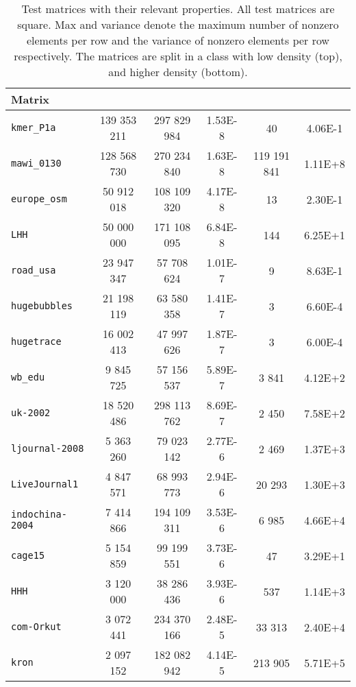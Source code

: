 \begin{table}
    \centering
    \small
    \caption{Test matrices with their relevant properties\protect\footnotemark. All test matrices are square. Max and variance denote the maximum number of nonzero elements per row and the variance of nonzero elements per row respectively. The matrices are split in a class with low density (top), and higher density (bottom).}\label{tab:Matrices}
    \begin{tabular}{l S[table-format=9.0] S[table-format=9.0] S[table-format=1.2e2] S[table-format=9.0] S[table-format=1.2e2]}
        Matrix &  &  &  &  & \\ 
        \midrule
        \texttt{kmer\_P1a}      & 139 353 211 & 297 829 984  & 1.53E-8 & 40          & 4.06E-1\\
        \texttt{mawi\_0130}     & 128 568 730 & 270 234 840  & 1.63E-8 & 119 191 841 & 1.11E+8\\
        \texttt{europe\_osm}    & 50 912 018  & 108 109 320  & 4.17E-8 & 13          & 2.30E-1\\
        \texttt{LHH}            & 50 000 000  & 171 108 095  & 6.84E-8 & 144         & 6.25E+1\\
        \texttt{road\_usa}      & 23 947 347  & 57 708 624   & 1.01E-7 & 9           & 8.63E-1\\
        \texttt{hugebubbles}    & 21 198 119  & 63 580 358   & 1.41E-7 & 3           & 6.60E-4\\
        \texttt{hugetrace}      & 16 002 413  & 47 997 626   & 1.87E-7 & 3           & 6.00E-4\\
        \texttt{wb\_edu}        & 9 845 725   & 57 156 537   & 5.89E-7 & 3 841       & 4.12E+2\\        
        \texttt{uk-2002}        & 18 520 486  & 298 113 762  & 8.69E-7 & 2 450       & 7.58E+2\\
        \midrule
        \texttt{ljournal-2008}  & 5 363 260   & 79 023 142   & 2.77E-6 & 2 469       & 1.37E+3\\
        \texttt{LiveJournal1}   & 4 847 571   & 68 993 773   & 2.94E-6 & 20 293      & 1.30E+3\\
        \texttt{indochina-2004} & 7 414 866   & 194 109 311  & 3.53E-6 & 6 985       & 4.66E+4\\
        \texttt{cage15}         & 5 154 859   & 99 199 551   & 3.73E-6 & 47          & 3.29E+1\\
        \texttt{HHH}            & 3 120 000   & 38 286 436   & 3.93E-6 & 537         & 1.14E+3\\
        \texttt{com-Orkut}      & 3 072 441   & 234 370 166  & 2.48E-5 & 33 313      & 2.40E+4\\
        \texttt{kron}           & 2 097 152   & 182 082 942  & 4.14E-5 & 213 905     & 5.71E+5\\
    \end{tabular}
\end{table}
